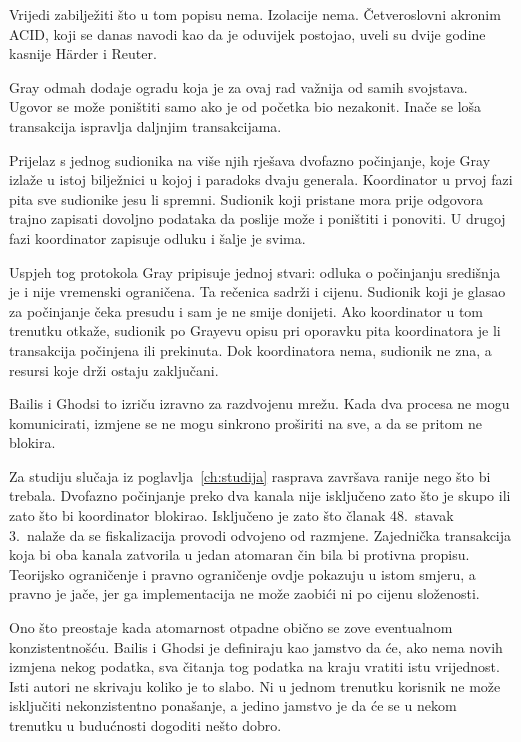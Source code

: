 Vrijedi zabilježiti što u tom popisu nema. Izolacije nema. Četveroslovni
akronim ACID, koji se danas navodi kao da je oduvijek postojao, uveli su
dvije godine kasnije Härder i Reuter\cite{haerder1983principles}.

Gray odmah dodaje ogradu koja je za ovaj rad važnija od samih svojstava.
Ugovor se može poništiti samo ako je od početka bio nezakonit. Inače se
loša transakcija ispravlja daljnjim transakcijama.

Prijelaz s jednog sudionika na više njih rješava dvofazno počinjanje, koje
Gray izlaže u istoj bilježnici u kojoj i paradoks dvaju
generala\cite{gray1978notes}. Koordinator u prvoj fazi pita sve sudionike
jesu li spremni. Sudionik koji pristane mora prije odgovora trajno zapisati
dovoljno podataka da poslije može i poništiti i ponoviti. U drugoj fazi
koordinator zapisuje odluku i šalje je svima.

Uspjeh tog protokola Gray pripisuje jednoj stvari: odluka o počinjanju
središnja je i nije vremenski ograničena. Ta rečenica sadrži i cijenu.
Sudionik koji je glasao za počinjanje čeka presudu i sam je ne smije
donijeti. Ako koordinator u tom trenutku otkaže, sudionik po Grayevu
opisu pri oporavku pita koordinatora je li transakcija počinjena ili
prekinuta. Dok koordinatora nema, sudionik ne zna, a resursi koje drži
ostaju zaključani.

Bailis i Ghodsi to izriču izravno za razdvojenu mrežu. Kada dva procesa ne
mogu komunicirati, izmjene se ne mogu sinkrono proširiti na sve, a da se
pritom ne
blokira\cite{bailis2013eventual}.

Za studiju slučaja iz poglavlja~\ref{ch:studija} rasprava završava ranije
nego što bi trebala. Dvofazno počinjanje preko dva kanala nije isključeno
zato što je skupo ili zato što bi koordinator blokirao. Isključeno je zato
što članak 48.\ stavak 3.\ nalaže da se fiskalizacija provodi odvojeno od
razmjene. Zajednička transakcija koja bi oba kanala zatvorila u jedan
atomaran čin bila bi protivna propisu. Teorijsko ograničenje i pravno
ograničenje ovdje pokazuju u istom smjeru, a pravno je jače, jer ga
implementacija ne može zaobići ni po cijenu složenosti.

Ono što preostaje kada atomarnost otpadne obično se zove eventualnom
konzistentnošću. Bailis i Ghodsi je definiraju kao jamstvo da će, ako nema
novih izmjena nekog podatka, sva čitanja tog podatka na kraju vratiti istu
vrijednost. Isti autori ne skrivaju koliko je to slabo. Ni u jednom
trenutku korisnik ne može isključiti nekonzistentno ponašanje, a jedino
jamstvo je da će se u nekom trenutku u budućnosti dogoditi nešto dobro.

